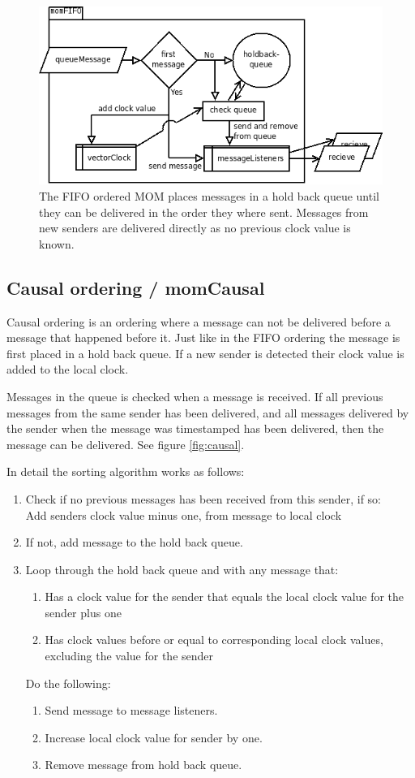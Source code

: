 \documentclass[a4paper,english]{article}
\begin{document}
\begin{figure}
\includegraphics[width=\textwidth]{momFIFO.png}
\caption{The FIFO ordered MOM places messages in a hold back queue until they can be delivered in the order they where sent. Messages from new senders are delivered directly as no previous clock value is known.}
\label{fig:fifo}
\end{figure}

\subsection{Causal ordering / momCausal}
\label{mo-causal}
Causal ordering is an ordering where a message can not be delivered before a message that happened before it. Just like in the FIFO ordering the message is first placed in a hold back queue. If a new sender is detected their clock value is added to the local clock.

Messages in the queue is checked when a message is received. If all previous messages from the same sender has been delivered, and all messages delivered by the sender when the message was timestamped has been delivered, then the message can be delivered. See figure \vref{fig:causal}.

In detail the sorting algorithm works as follows:
\begin{enumerate}
\item Check if no previous messages has been received from this sender, if so:\\
	Add senders clock value minus one, from message to local clock
\item If not, add message to the hold back queue.
\item Loop through the hold back queue and with any message that:
	\begin{enumerate}
	\item Has a clock value for the sender that equals the local clock value for the sender plus one
	\item Has clock values before or equal to corresponding local clock values, excluding the value for the sender
	\end{enumerate}
	Do the following:
	\begin{enumerate}
	\item Send message to message listeners.
	\item Increase local clock value for sender by one.
	\item Remove message from hold back queue.
	\end{enumerate}
\end{enumerate}
\end{document}

